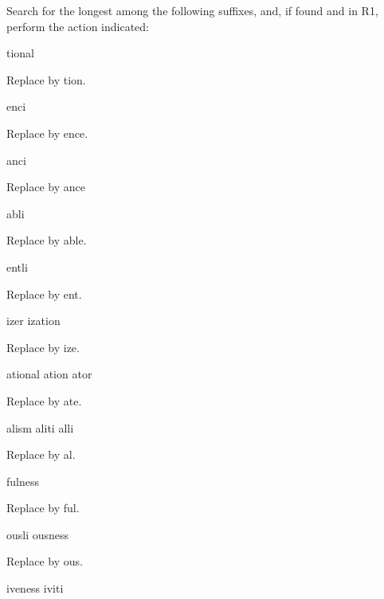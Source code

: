 Search for the longest among the following suffixes, and, if found and in R1, perform the action indicated\-:
\begin{DoxyItemize}
\item tional
\begin{DoxyItemize}
\item Replace by tion.
\end{DoxyItemize}
\item enci
\begin{DoxyItemize}
\item Replace by ence.
\end{DoxyItemize}
\item anci
\begin{DoxyItemize}
\item Replace by ance
\end{DoxyItemize}
\item abli
\begin{DoxyItemize}
\item Replace by able.
\end{DoxyItemize}
\item entli
\begin{DoxyItemize}
\item Replace by ent.
\end{DoxyItemize}
\item izer ization
\begin{DoxyItemize}
\item Replace by ize.
\end{DoxyItemize}
\item ational ation ator
\begin{DoxyItemize}
\item Replace by ate.
\end{DoxyItemize}
\item alism aliti alli
\begin{DoxyItemize}
\item Replace by al.
\end{DoxyItemize}
\item fulness
\begin{DoxyItemize}
\item Replace by ful.
\end{DoxyItemize}
\item ousli ousness
\begin{DoxyItemize}
\item Replace by ous.
\end{DoxyItemize}
\item iveness iviti
\begin{DoxyItemize}

\end{DoxyItemize}
\end{DoxyItemize}
